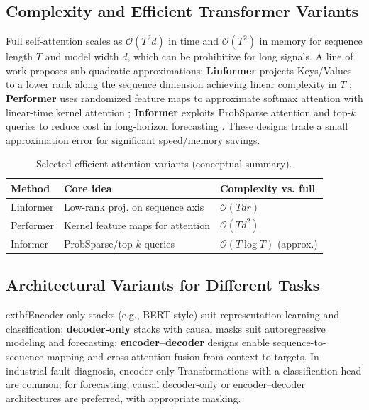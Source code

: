 \subsection{Complexity and Efficient Transformer Variants}
Full self-attention scales as \(\mathcal{O}(T^2 d)\) in time and \(\mathcal{O}(T^2)\) in memory for sequence length \(T\) and model width \(d\), which can be prohibitive for long signals. A line of work proposes sub-quadratic approximations: \textbf{Linformer} projects Keys/Values to a lower rank along the sequence dimension achieving linear complexity in \(T\) \citep{wang2020linformer}; \textbf{Performer} uses randomized feature maps to approximate softmax attention with linear-time kernel attention \citep{choromanski2021rethinking}; \textbf{Informer} exploits ProbSparse attention and top-$k$ queries to reduce cost in long-horizon forecasting \citep{zhou2021informer}. These designs trade a small approximation error for significant speed/memory savings.

\begin{table}[t]
\centering
\caption{Selected efficient attention variants (conceptual summary).}
\label{tab:efficient_attention}
\begin{tabular}{l l l}
\hline
Method & Core idea & Complexity vs. full \\ \hline
Linformer & Low-rank proj. on sequence axis & \(\mathcal{O}(T d r)\) \\
Performer & Kernel feature maps for attention & \(\mathcal{O}(T d^2)\) \\
Informer & ProbSparse/top-$k$ queries & \(\mathcal{O}(T \log T)\) (approx.) \\ \hline
\end{tabular}
\end{table}

\subsection{Architectural Variants for Different Tasks}
	extbf{Encoder-only} stacks (e.g., BERT-style) suit representation learning and classification; \textbf{decoder-only} stacks with causal masks suit autoregressive modeling and forecasting; \textbf{encoder--decoder} designs enable sequence-to-sequence mapping and cross-attention fusion from context to targets. In industrial fault diagnosis, encoder-only Transformations with a classification head are common; for forecasting, causal decoder-only or encoder--decoder architectures are preferred, with appropriate masking.


